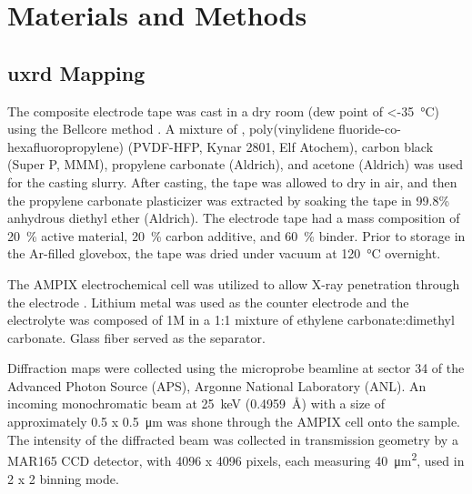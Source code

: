 \documentclass{article}
\begin{document}
\section*{Materials and Methods}
\label{sec:methods}

\subsection*{\gls{uxrd} Mapping}

The \nca{} composite electrode tape was cast in a dry room (dew point
of \SI{<-35}{\celsius}) using the Bellcore method \cite{warren1996}. A
mixture of \nca{}, poly(vinylidene fluoride-co-hexafluoropropylene)
(PVDF-HFP, Kynar 2801, Elf Atochem), carbon black (Super P, MMM),
propylene carbonate (Aldrich), and acetone (Aldrich) was used for the
casting slurry. After casting, the tape was allowed to dry in air, and
then the propylene carbonate plasticizer was extracted by soaking the
tape in 99.8\% anhydrous diethyl ether (Aldrich). The electrode tape
had a mass composition of \SI{20}{\percent} active material,
\SI{20}{\percent} carbon additive, and \SI{60}{\percent} binder. Prior
to storage in the Ar-filled glovebox, the tape was dried under vacuum
at \SI{120}{\celsius} overnight.

The AMPIX electrochemical cell was utilized to allow X-ray penetration
through the electrode \cite{borkiewicz2012}. Lithium metal was used as
the counter electrode and the electrolyte was composed of 1M
 in a 1:1 mixture of ethylene carbonate:dimethyl
carbonate. Glass fiber served as the separator.

Diffraction maps were collected using the microprobe beamline at sector
34 of the Advanced Photon Source (APS), Argonne National Laboratory
(ANL). An incoming monochromatic beam at \SI{25}{\kilo\electronvolt}
(\SI{0.4959}{\angstrom}) with a size of approximately \num{0.5} x
\SI{0.5}{\micro\meter} was shone through the AMPIX cell onto the
sample. The intensity of the diffracted beam was collected in
transmission geometry by a MAR165 CCD detector, with 4096 x 4096
pixels, each measuring \SI{40}{\square\micro\meter}, used in 2 x 2
binning mode.
\end{document}
